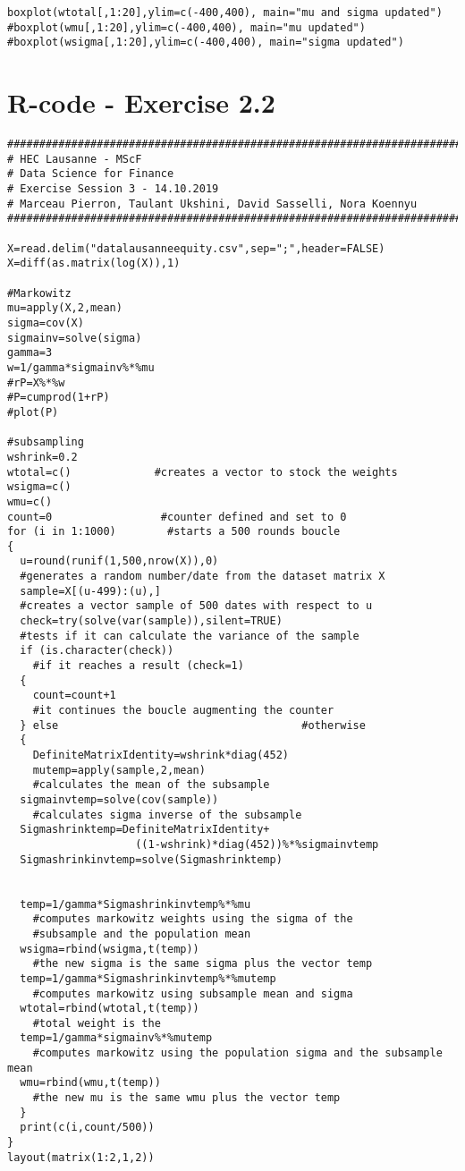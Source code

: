 \begin{appendices}
\begin{verbatim}
boxplot(wtotal[,1:20],ylim=c(-400,400), main="mu and sigma updated")
#boxplot(wmu[,1:20],ylim=c(-400,400), main="mu updated")
#boxplot(wsigma[,1:20],ylim=c(-400,400), main="sigma updated")

\end{verbatim}


\chapter{R-code - Exercise 2.2}

\begin{verbatim}
##########################################################################
# HEC Lausanne - MScF
# Data Science for Finance
# Exercise Session 3 - 14.10.2019
# Marceau Pierron, Taulant Ukshini, David Sasselli, Nora Koennyu
##########################################################################

X=read.delim("datalausanneequity.csv",sep=";",header=FALSE)
X=diff(as.matrix(log(X)),1)

#Markowitz
mu=apply(X,2,mean)
sigma=cov(X)
sigmainv=solve(sigma)
gamma=3
w=1/gamma*sigmainv%*%mu
#rP=X%*%w
#P=cumprod(1+rP)
#plot(P)

#subsampling
wshrink=0.2
wtotal=c()             #creates a vector to stock the weights
wsigma=c()
wmu=c()
count=0                 #counter defined and set to 0
for (i in 1:1000)        #starts a 500 rounds boucle
{
  u=round(runif(1,500,nrow(X)),0)               
  #generates a random number/date from the dataset matrix X
  sample=X[(u-499):(u),]                        
  #creates a vector sample of 500 dates with respect to u
  check=try(solve(var(sample)),silent=TRUE)     
  #tests if it can calculate the variance of the sample
  if (is.character(check))                      
    #if it reaches a result (check=1)
  {
    count=count+1                             
    #it continues the boucle augmenting the counter
  } else                                      #otherwise
  { 
    DefiniteMatrixIdentity=wshrink*diag(452)
    mutemp=apply(sample,2,mean)               
    #calculates the mean of the subsample
  sigmainvtemp=solve(cov(sample))           
    #calculates sigma inverse of the subsample
  Sigmashrinktemp=DefiniteMatrixIdentity+
                    ((1-wshrink)*diag(452))%*%sigmainvtemp
  Sigmashrinkinvtemp=solve(Sigmashrinktemp)
  
  
  temp=1/gamma*Sigmashrinkinvtemp%*%mu            
    #computes markowitz weights using the sigma of the
    #subsample and the population mean
  wsigma=rbind(wsigma,t(temp))              
    #the new sigma is the same sigma plus the vector temp
  temp=1/gamma*Sigmashrinkinvtemp%*%mutemp        
    #computes markowitz using subsample mean and sigma
  wtotal=rbind(wtotal,t(temp))             
    #total weight is the 
  temp=1/gamma*sigmainv%*%mutemp            
    #computes markowitz using the population sigma and the subsample mean
  wmu=rbind(wmu,t(temp))                    
    #the new mu is the same wmu plus the vector temp 
  }
  print(c(i,count/500))
}
layout(matrix(1:2,1,2))


\end{verbatim}
\end{appendices}
